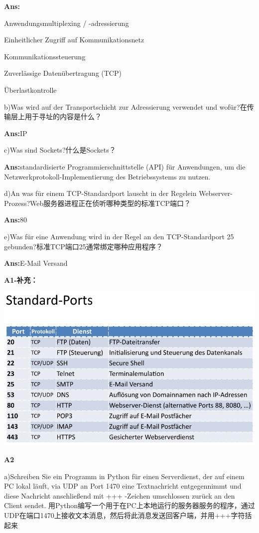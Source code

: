 \documentclass[fleqn]{article}
\begin{document}
\textbf{Ans:}

\indent \indent Anwendungsmultiplexing / -adressierung 

\indent \indent Einheitlicher Zugriff auf Kommunikationsnetz 

\indent \indent Kommunikationssteuerung 

\indent \indent Zuverlässige Datenübertragung (TCP) 

\indent \indent Überlastkontrolle

b)Was wird auf der Transportschicht zur Adressierung verwendet und wofür?在传输层上用于寻址的内容是什么？

\textbf{Ans:}IP

c)Was sind Sockets?什么是Sockets？

\textbf{Ans:}standardisierte Programmierschnittstelle (API) für Anwendungen, um die Netzwerkprotokoll-Implementierung des Betriebssystems zu nutzen.

d)An was für einem TCP-Standardport lauscht in der Regelein Webserver-Prozess?Web服务器进程正在侦听哪种类型的标准TCP端口？

\textbf{Ans:}80

e)Was für eine Anwendung wird in der Regel an den TCP-Standardport 25 gebunden?标准TCP端口25通常绑定哪种应用程序？

\textbf{Ans:}E-Mail Versand

\textbf{A1-补充：}

\begin{center}
    \includegraphics[scale=0.5]{bild17.png}
\end{center}

\noindent\textbf{A2}

a)Schreiben Sie ein Programm in Python für einen Serverdienst, der auf einem PC lokal läuft, via UDP an Port 1470 eine Textnachricht entgegennimmt und diese Nachricht anschließend mit +++ -Zeichen umschlossen zurück an den Client sendet.
用Python编写一个用于在PC上本地运行的服务器服务的程序，通过UDP在端口1470上接收文本消息，然后将此消息发送回客户端，并用+++字符括起来
\end{document}
